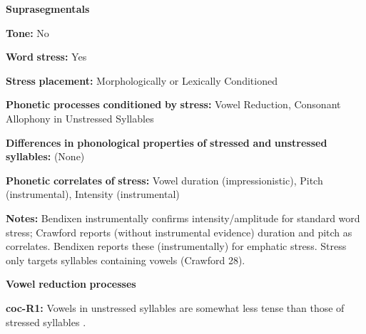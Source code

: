 \documentclass[output=paper]{langsci/langscibook}
\begin{document}
\begin{styleBody}
\textbf{Suprasegmentals}
\end{styleBody}

\begin{styleBody}
\textbf{Tone:} No
\end{styleBody}

\begin{styleBody}
\textbf{Word} \textbf{stress:} Yes
\end{styleBody}

\begin{styleBody}
\textbf{Stress} \textbf{placement:} Morphologically or Lexically Conditioned
\end{styleBody}

\begin{styleBody}
\textbf{Phonetic} \textbf{processes} \textbf{conditioned} \textbf{by} \textbf{stress:} Vowel Reduction, Consonant Allophony in Unstressed Syllables
\end{styleBody}

\begin{styleBody}
\textbf{Differences} \textbf{in} \textbf{phonological} \textbf{properties} \textbf{of} \textbf{stressed} \textbf{and} \textbf{unstressed} \textbf{syllables:} (None)
\end{styleBody}

\begin{styleBody}
\textbf{Phonetic} \textbf{correlates} \textbf{of} \textbf{stress:} Vowel duration (impressionistic), Pitch (instrumental), Intensity (instrumental)
\end{styleBody}

\begin{styleBody}
\textbf{Notes:} Bendixen instrumentally confirms intensity/amplitude for standard word stress; Crawford reports (without instrumental evidence) duration and pitch as correlates. Bendixen reports these (instrumentally) for emphatic stress. Stress only targets syllables containing vowels (Crawford 28).
\end{styleBody}

\begin{styleBody}
\textbf{Vowel} \textbf{reduction} \textbf{processes}
\end{styleBody}

\begin{styleBody}
\textbf{coc-R1:} Vowels in unstressed syllables are somewhat less tense than those of stressed syllables \citep[22]{Crawford1966}.
\end{styleBody}
\end{document}

